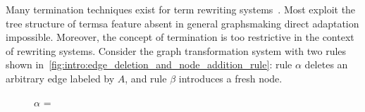 Many termination techniques exist for term rewriting systems~\cite{nipkow1998term, dershowitz1982orderings, middeldorp1997simple, arts2000termination}.  
Most exploit the tree structure of terms\textemdash a feature absent in general graphs\textemdash making direct adaptation impossible. 
Moreover, the concept of termination is too restrictive in the context of rewriting systems. Consider the graph transformation system with two rules shown in~\autoref{fig:intro:edge_deletion_and_node_addition_rule}: rule $\alpha$ deletes an arbitrary edge labeled by $A$, and rule $\beta$ introduces a fresh node.
  \begin{figure}[!ht]
        \centering
        $\alpha$ = {
        }
    

\end{figure}
